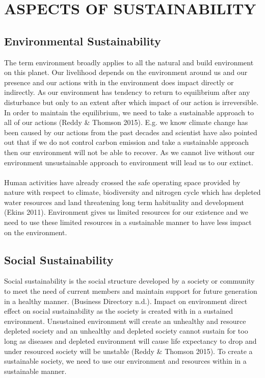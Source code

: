 \documentclass{article}
\begin{document}
\section{ASPECTS OF SUSTAINABILITY}
\subsection{Environmental Sustainability}\label{SEC:Enviro}
The term environment broadly applies to all the natural and build environment on this planet. Our livelihood depends on the environment around us and our presence and our actions with in the environment does impact directly or indirectly. As our environment has tendency to return to equilibrium after any disturbance but only to an extent after which impact of our action is irreversible. In order to maintain the equilibrium, we need to take a sustainable approach to all of our actions (Reddy \& Thomson 2015). E.g. we know climate change has been caused by our actions from the past decades and scientist have also pointed out that if we do not control carbon emission and take a sustainable approach then our environment will not be able to recover. As we cannot live without our environment unsustainable approach to environment will lead us to our extinct.\\
\\
Human activities have already crossed the safe operating space provided by nature with respect to climate, biodiversity and nitrogen cycle which has depleted water resources and land threatening long term habituality and development (Ekins 2011). Environment gives us limited resources for our existence and we need to use these limited resources in a sustainable manner to have less impact on the environment.
\subsection{Social Sustainability}\label{sec:Social}
Social sustainability is the social structure developed by a society or community to meet the need of current members and maintain support for future generation in a healthy manner. (Business Directory n.d.). Impact on environment direct effect on social sustainability as the society is created with in a sustained environment. Unsustained environment will create an unhealthy and resource depleted society and an unhealthy and depleted society cannot sustain for too long as diseases and depleted environment will cause life expectancy to drop and under resourced society will be unstable (Reddy \& Thomson 2015). To create a sustainable society, we need to use our environment and resources within in a sustainable manner.
\end{document}
